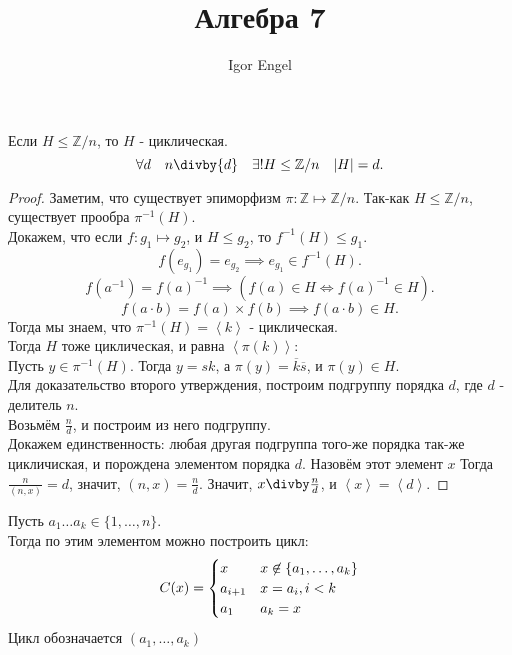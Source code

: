 \documentclass[11pt, oneside]{article}   	%
\title{Алгебра 7}
\author{Igor Engel}
\date{}
\begin{document}
\maketitle
\section{}
    \begin{theorem}
        Если $H \le \mathbb{Z}/n$, то $H$ - циклическая.\\
        \[ \forall{d}\quad n\divby{d}\quad \exists!{H \le \mathbb{Z}/n}\quad |H| =d .\]
        \begin{proof}
            Заметим, что существует эпиморфизм $\pi : \mathbb{Z} \mapsto \mathbb{Z}/n$.
            Так-как $H \le \mathbb{Z}/n$, существует прообра $\pi^{-1}(H)$.\\
            Докажем, что если $f: g_1 \mapsto g_2$, и $H \le g_2$, то $f^{-1}(H) \le g_1$.\\
            \[ f(e_{g_1}) = e_{g_2} \implies e_{g_1}\in f^{-1}(H) .\]
            \[ f(a^{-1}) = f(a)^{-1} \implies \left( f(a)\in H \iff f(a)^{-1}\in H \right)  .\]
            \[ f(a \cdot b) = f(a) \times f(b) \implies f(a \cdot b)\in H .\]
            Тогда мы знаем, что $\pi^{-1}(H) = \left<k\right>$ - циклическая.\\
            Тогда $H$ тоже циклическая, и равна $\left<\pi(k)\right>$:\\
            Пусть $y\in \pi^{-1}(H)$. Тогда $y=sk$, а $\pi(y)=\overline{k}\overline{s}$, и $\pi(y)\in H$.\\
            Для доказательство второго утверждения, построим подгруппу порядка $d$, где $d$ - делитель $n$.\\
            Возьмём $\frac{n}{d}$, и построим из него подгруппу.\\
            Докажем единственность: любая другая подгруппа того-же порядка так-же цикличиская, и порождена элементом порядка $d$. Назовём этот элемент $x$ Тогда $\frac{n}{\left( n,x \right) } = d$, значит, $\left( n, x\right) = \frac{n}{d}$. Значит, $x\divby \frac{n}{d}$, и $\left<x\right> = \left<d\right>$.
        \end{proof}
    \end{theorem}
    \begin{definition}
        Пусть $a_1 \ldots a_k\in \{1, \ldots, n\} $.\\
        Тогда по этим элементом можно построить цикл:
        \begin{equation*}
            C(x) = \begin{cases}
                x & x \not\in \{a_1, \ldots, a_k\}\cr
                a_{i+1} & x=a_i, i < k\cr
                a_1 & a_k=x
            \end{cases}
        \end{equation*}
        Цикл обозначается $\left( a_1, \ldots, a_k \right) $
    \end{definition}
\end{document}
